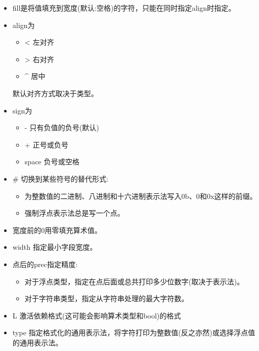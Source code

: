 \begin{itemize}
\item
fill是将值填充到宽度(默认:空格)的字符，只能在同时指定align时指定。

\item
align为

\begin{itemize}
\item
< 左对齐

\item
> 右对齐

\item
\^{} 居中
\end{itemize}

默认对齐方式取决于类型。

\item
sign为

\begin{itemize}
\item
- 只有负值的负号(默认)

\item
+ 正号或负号

\item
space 负号或空格
\end{itemize}

\item
\# 切换到某些符号的替代形式:

\begin{itemize}
\item
为整数值的二进制、八进制和十六进制表示法写入0b、0和0x这样的前缀。

\item
强制浮点表示法总是写一个点。
\end{itemize}

\item
宽度前的0用零填充算术值。

\item
width 指定最小字段宽度。

\item
点后的prec指定精度:

\begin{itemize}
\item
对于浮点类型，指定在点后面或总共打印多少位数字(取决于表示法)。

\item
对于字符串类型，指定从字符串处理的最大字符数。
\end{itemize}

\item
L 激活依赖格式(这可能会影响算术类型和bool)的格式

\item
type 指定格式化的通用表示法，将字符打印为整数值(反之亦然)或选择浮点值的通用表示法。
\end{itemize}

